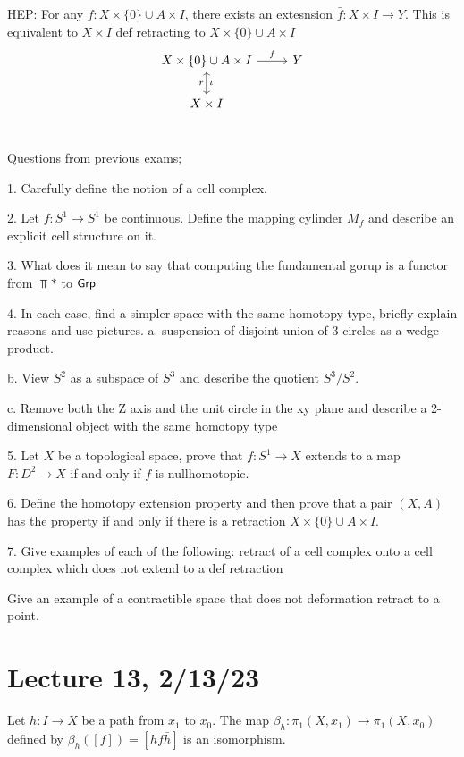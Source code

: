 \documentclass[x11names,reqno,14pt]{extarticle}
\begin{document}
HEP: For any $f:X\times\{0\}\cup A\times I$, there exists an extesnsion $\bar{f}:X\times I \to Y$. This is equivalent to $X\times I$ def retracting to $X\times\{0\}\cup A\times I$
\[
\begin{tikzcd}
X\times\{0\}\cup A\times I \ar[d, "\iota"] \ar[r, "f"] & Y \\
X\times I \ar[u, "r"] \\ & 
\end{tikzcd}
\]

Questions from previous exams;

1. Carefully define the notion of a cell complex. 

2. Let $f:S^1\to S^1$ be continuous. Define the mapping cylinder $M_f$ and describe an explicit cell structure on it. 

3. What does it mean to say that computing the fundamental gorup is a functor from $\Top*$ to ${{\text{\sffamily {Grp}}}}$

4. In each case, find a simpler space with the same homotopy type, briefly explain reasons and use pictures. 
	a. suspension of disjoint union of 3 circles as a wedge product. 

	b. View $S^2$ as a subspace of $S^3$ and describe the quotient $S^3/S^2$. 

	c. Remove both the Z axis and the unit circle in the xy plane and describe a 2-dimensional object with the same homotopy type

5. Let $X$ be a topological space, prove that $f:S^1\to X$ extends to a map $F:D^2\to X$ if and only if $f$ is nullhomotopic. 

6. Define the homotopy extension property and then prove that a pair $(X, A)$ has the property if and only if there is a retraction $X\times\{0\}\cup A\times I$. 

7. Give examples of each of the following:
		retract of a cell complex onto a cell complex which does not extend to a def retraction

		Give an example of a contractible space that does not deformation retract to a point. 

\section*{Lecture 13, 2/13/23}

\prop

Let $h:I\to X$ be a path from $x_1$ to $x_0$. The map $\beta_h:\pi_1(X, x_1) \to \pi_1(X, x_0)$ defined by $\beta_h([f]) = [hf\bar{h}]$ is an isomorphism. 
\end{document}
